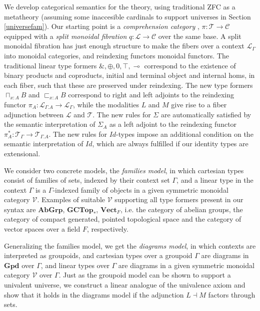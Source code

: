 We develop categorical semantics for the theory, using traditional ZFC as a metatheory (assuming some inaccesible cardinals to support universes in Section \ref{universefam}). Our starting point is a \textit{comprehension category} \cite{jacobs}, $\pi : \mathcal{T} \to \mathcal{C}$ equipped with a \textit{split monoidal fibration} $q : \mathcal{L} \to \mathcal{C}$ over the same base. A split monoidal fibration has just enough structure to make the fibers over a context $\mathcal{L}_\Gamma$ into monoidal categories, and reindexing functors monoidal functors. The traditional linear type formers $\&, \oplus, 0, \top, \multimap$ correspond to the existence of binary products and coproducts, initial and terminal object and internal homs, in each fiber, such that these are preserved under reindexing. The new type formers $\sqcap_{x : A}B$ and $\sqsubset_{x :A}B$ correspond to right and left adjoints to the reindexing functor $\pi_A : \mathcal{L}_{\Gamma.A} \to \mathcal{L}_\Gamma$, while the modalities $L$ and $M$ give rise to a fiber adjunction between $\mathcal{L}$ and $\mathcal{T}$. The new rules for $\Sigma$ are automatically satisfied by the semantic interpretation of $\Sigma_A$ as a left adjoint to the reindexing functor $\pi_A^* : \mathcal{T}_\Gamma \to \mathcal{T}_{\Gamma.A}$. The new rules for $Id$-types impose an additional condition on the semantic interpretation of $Id$, which are always fulfilled if our identity types are extensional.

We consider two concrete models, the \textit{families model}, in which cartesian types consist of families of sets, indexed by their context set $\Gamma$, and a linear type in the context $\Gamma$ is a $\Gamma$-indexed family of objects in a given symmetric monoidal category $\mathcal{V}$. Examples of suitable $\mathcal{V}$ supporting all type formers present in our syntax are $\mathbf{AbGrp}$, $\mathbf{GCTop}_*$, $\mathbf{Vect}_F$, i.e. the category of abelian groups, the category of compact generated, pointed topological space and the category of vector spaces over a field $F$, respectively.

Generalizing the families model, we get the \textit{diagrams model}, in which contexts are interpreted as groupoids, and cartesian types over a groupoid $\Gamma$ are diagrams in $\mathbf{Gpd}$ over $\Gamma$, and linear types over $\Gamma$ are diagrams in a given symmetric monoidal category $\mathcal{V}$ over $\Gamma$. Just as the groupoid model \cite{hofmann1998} can be shown to support a univalent universe, we construct a linear analogue of the univalence axiom and show that it holds in the diagrams model if the adjunction $L \dashv M$ factors through sets.

